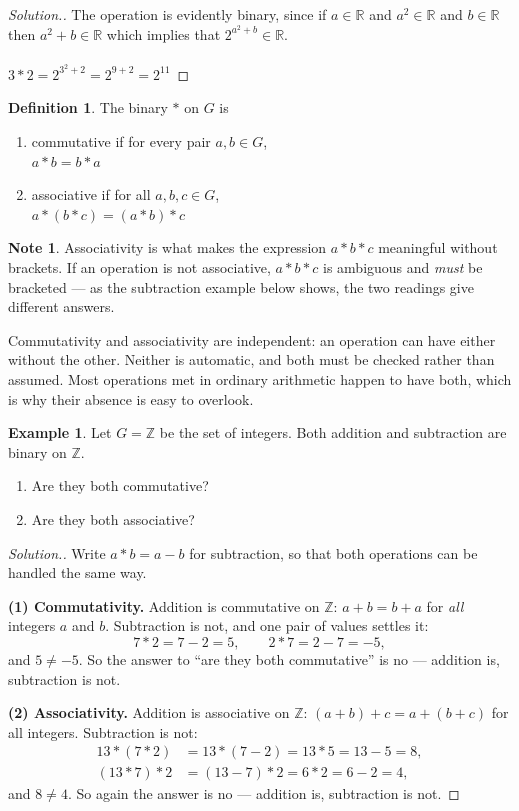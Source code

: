 \documentclass[11pt,a4paper]{article}
\theoremstyle{definition}
\newtheorem{definition}[thm]{Definition}
\newtheorem{example}[thm]{Example}
\newtheorem{note}[thm]{Note}
\newenvironment{solution}
  {\renewcommand{\qedsymbol}{}\begin{proof}[\textit{Solution}.]}
  {\end{proof}}
\begin{document}
\begin{solution}

The operation is evidently binary, since if $a\in \mathbb{R}$ and $a^2\in \mathbb{R}$ and $b\in \mathbb{R}$ then $a^2+b\in \mathbb{R}$ which implies that $2^{a^2+b}\in \mathbb{R}.$\\\\ $3*2=2^{3^2+2}=2^{9+2}=2^{11}$
\end{solution}
\begin{definition}

The binary $*$ on $G$ is
\begin{enumerate}
\item[(i).] commutative if for every pair $a,b\in G$, \\ $a*b=b*a$
\item[(ii).] associative if for all $a,b,c\in G$,\\ $a*(b*c)=(a*b)*c$\\
\end{enumerate}
\end{definition}
\begin{note}
Associativity is what makes the expression $a*b*c$ meaningful without brackets. If
an operation is not associative, $a*b*c$ is ambiguous and \emph{must} be
bracketed --- as the subtraction example below shows, the two readings give
different answers.

Commutativity and associativity are independent: an operation can have either
without the other. Neither is automatic, and both must be checked rather than
assumed. Most operations met in ordinary arithmetic happen to have both, which is
why their absence is easy to overlook.
\end{note}

\begin{example}
Let $G=\mathbb{Z}$ be the set of integers. Both addition and subtraction are binary
on $\mathbb{Z}$.
\begin{enumerate}
\item[(1).] Are they both commutative?
\item[(2).] Are they both associative?
\end{enumerate}
\end{example}


\begin{solution}
Write $a*b=a-b$ for subtraction, so that both operations can be handled the same
way.

\textbf{(1) Commutativity.} Addition is commutative on $\mathbb{Z}$:
$a+b=b+a$ for \emph{all} integers $a$ and $b$. Subtraction is not, and one pair
of values settles it:
$$7*2=7-2=5,\qquad 2*7=2-7=-5,$$
and $5\neq-5$. So the answer to ``are they both commutative'' is no --- addition
is, subtraction is not.

\textbf{(2) Associativity.} Addition is associative on $\mathbb{Z}$:
$(a+b)+c=a+(b+c)$ for all integers. Subtraction is not:
\begin{align*}
13*(7*2) & = 13*(7-2) = 13*5 = 13-5 = 8,\\
(13*7)*2 & = (13-7)*2 = 6*2 = 6-2 = 4,
\end{align*}
and $8\neq4$. So again the answer is no --- addition is, subtraction is not.
\end{solution}
\end{document}
